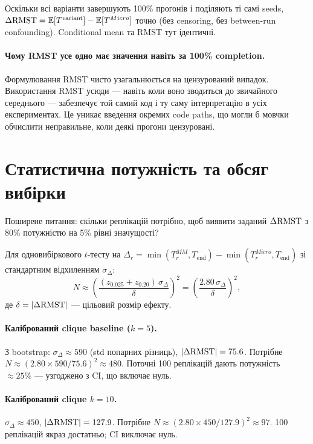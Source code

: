 \documentclass[11pt,a4paper]{article}
\begin{document}
Оскільки всі варіанти завершують 100\% прогонів і поділяють ті самі seeds,
$\Delta\mathrm{RMST} = \mathbb{E}[T^{\mathrm{variant}}] - \mathbb{E}[T^{Micro}]$ точно
(без censoring, без between-run confounding).  Conditional mean та RMST
тут ідентичні.

\paragraph{Чому RMST усе одно має значення навіть за 100\% completion.}
Формулювання RMST чисто узагальнюється на цензурований випадок.
Використання RMST усюди --- навіть коли воно зводиться до звичайного середнього ---
забезпечує той самий код і ту саму інтерпретацію в усіх експериментах.
Це уникає введення окремих code paths, що могли б мовчки обчислити
неправильне, коли деякі прогони цензуровані.

\section{Статистична потужність та обсяг вибірки}

Поширене питання: скільки реплікацій потрібно, щоб виявити заданий
$\Delta\mathrm{RMST}$ з 80\% потужністю на 5\% рівні значущості?

Для одновибіркового $t$-тесту на $\Delta_r = \min(T_r^{MM}, T_{\mathrm{end}}) -
\min(T_r^{Micro}, T_{\mathrm{end}})$ зі стандартним відхиленням $\sigma_\Delta$:
\[
  N \approx \left(\frac{(z_{0.025} + z_{0.20})\, \sigma_\Delta}{\delta}\right)^2
           = \left(\frac{2.80\, \sigma_\Delta}{\delta}\right)^2,
\]
де $\delta = |\Delta\mathrm{RMST}|$ --- цільовий розмір ефекту.

\paragraph{Калібрований clique baseline ($k=5$).}
З bootstrap: $\sigma_\Delta \approx 590$ (std попарних різниць),
$|\Delta\mathrm{RMST}| = 75.6$.  Потрібне $N \approx (2.80 \times 590 / 75.6)^2 \approx 480$.
Поточні 100 реплікацій дають потужність $\approx 25\%$ --- узгоджено з CI,
що включає нуль.

\paragraph{Калібрований clique $k=10$.}
$\sigma_\Delta \approx 450$, $|\Delta\mathrm{RMST}| = 127.9$.
Потрібне $N \approx (2.80 \times 450 / 127.9)^2 \approx 97$.
100 реплікацій якраз достатньо; CI виключає нуль.
\end{document}

